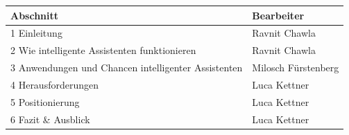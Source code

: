 \documentclass{common/nak}
\begin{document}
\newpage
\clearpage
\pagestyle{nakohnezahl}
\thispagestyle{nakohnezahl}
\printbibliography{}

\newpage
\begin{table}[h!]
\begin{tabular}{|l|l|}
\hline
\textbf{Abschnitt} & \textbf{Bearbeiter} \\ \hline
1 Einleitung                                        & Ravnit Chawla       \\ \hline
2 Wie intelligente Assistenten funktionieren        & Ravnit Chawla       \\ \hline
3 Anwendungen und Chancen intelligenter Assistenten & Milosch Fürstenberg \\ \hline
4 Herausforderungen                                 & Luca Kettner        \\ \hline
5 Positionierung                                    & Luca Kettner        \\ \hline
6 Fazit \& Ausblick                                 & Luca Kettner        \\ \hline
\end{tabular}
\end{table}
\end{document}
